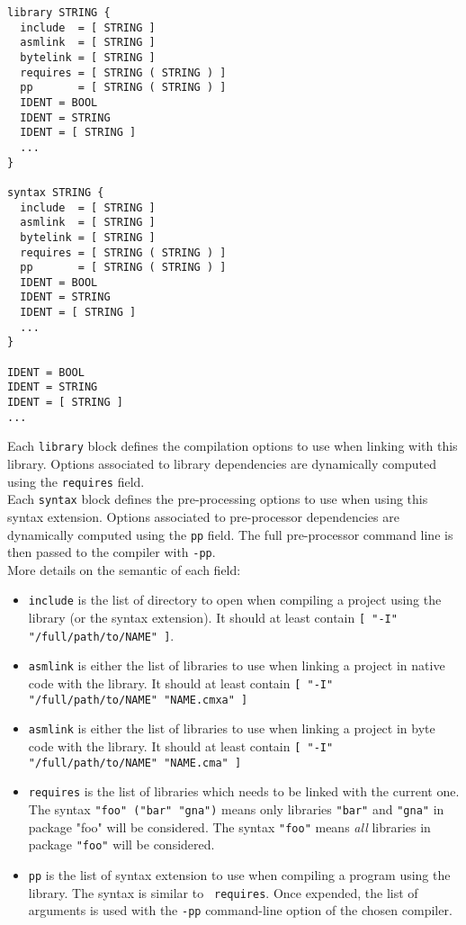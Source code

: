\documentclass[a4paper,11pt]{article}
\begin{document}
\begin{verbatim}
library STRING {
  include  = [ STRING ]
  asmlink  = [ STRING ]
  bytelink = [ STRING ]
  requires = [ STRING ( STRING ) ]
  pp       = [ STRING ( STRING ) ]
  IDENT = BOOL
  IDENT = STRING
  IDENT = [ STRING ]
  ...
}

syntax STRING {
  include  = [ STRING ]
  asmlink  = [ STRING ]
  bytelink = [ STRING ]
  requires = [ STRING ( STRING ) ]
  pp       = [ STRING ( STRING ) ]
  IDENT = BOOL
  IDENT = STRING
  IDENT = [ STRING ]
  ...
}

IDENT = BOOL
IDENT = STRING
IDENT = [ STRING ]
...
\end{verbatim}

Each {\tt library} block defines the compilation options to use when
linking with this library. Options associated to library dependencies
are dynamically computed using the {\tt requires} field.\\

Each {\tt syntax} block defines the pre-processing options to use when
using this syntax extension. Options associated to pre-processor
dependencies are dynamically computed using the {\tt pp} field. The
full pre-processor command line is then passed to the compiler with
{\tt -pp}.\\

More details on the semantic of each field:

\begin{itemize}

\item {\tt include} is the list of directory to open when compiling a
  project using the library (or the syntax extension). It should at
  least contain \verb+[ "-I" "/full/path/to/NAME" ]+.

\item {\tt asmlink} is either the list of libraries to use when
  linking a project in native code with the library. It should at
  least contain \verb+[ "-I" "/full/path/to/NAME" "NAME.cmxa" ]+

\item {\tt asmlink} is either the list of libraries to use when
  linking a project in byte code with the library. It should at least
  contain \verb+[ "-I" "/full/path/to/NAME" "NAME.cma" ]+

\item {\tt requires} is the list of libraries which needs to be linked
  with the current one. The syntax \verb+"foo" ("bar" "gna")+ means
  only libraries {\tt "bar"} and {\tt "gna"} in package "foo" will be
  considered. The syntax {\tt "foo"} means {\em all} libraries in
  package {\tt "foo"} will be considered.

\item {\tt pp} is the list of syntax extension to use when compiling a
  program using the library. The syntax is similar to {\tt
    requires}. Once expended, the list of arguments is used with the
  {\tt -pp} command-line option of the chosen compiler.

\end{itemize}
\end{document}
